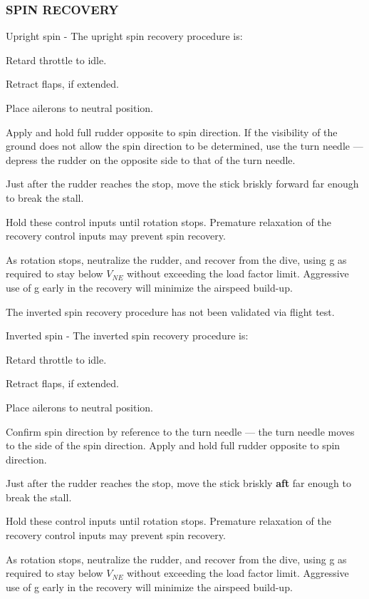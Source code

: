 
\subsubsection{SPIN RECOVERY}

Upright spin - The upright spin recovery procedure is:
\begin{enumerate*}
  \item Retard throttle to idle.
  \item Retract flaps, if extended.
  \item Place ailerons to neutral position.
  \item Apply and hold full rudder opposite to spin direction.  If the visibility of the ground does not allow the spin direction to be determined, use the turn needle --- depress the rudder on the opposite side to that of the turn needle.
  \item Just after the rudder reaches the stop, move the stick briskly forward far enough to break the stall.
  \item Hold these control inputs until rotation stops.  Premature relaxation of the recovery control inputs may prevent spin recovery.
  \item As rotation stops, neutralize the rudder, and recover from the dive, using g as required to stay below $V_{NE}$ without exceeding the load factor limit.  Aggressive use of g early in the recovery will minimize the airspeed build-up.
  \end{enumerate*}
  
\begin{Note}
The inverted spin recovery procedure has not been validated via flight test.
\end{Note}

Inverted spin - The inverted spin recovery procedure is:
\begin{enumerate*}
  \item Retard throttle to idle.
  \item Retract flaps, if extended.
  \item Place ailerons to neutral position.
  \item Confirm spin direction by reference to the turn needle --- the turn needle moves to the side of the spin direction.  Apply and hold full rudder opposite to spin direction.  
  \item Just after the rudder reaches the stop, move the stick briskly \textbf{aft} far enough to break the stall.
  \item Hold these control inputs until rotation stops.  Premature relaxation of the recovery control inputs may prevent spin recovery.
  \item As rotation stops, neutralize the rudder, and recover from the dive, using g as required to stay below $V_{NE}$ without exceeding the load factor limit.  Aggressive use of g early in the recovery will minimize the airspeed build-up.
  \end{enumerate*}
